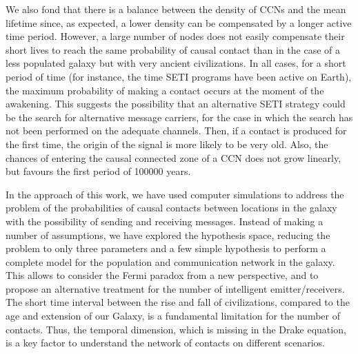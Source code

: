 \documentclass[crop]{CSLB}
\newcommand{\ceti}{CCN}
\newcommand{\cetis}{CCNs}
\begin{document}
We also fond that there 
is a balance between the density of \cetis{} and the mean
lifetime since, as expected, a lower density can be compensated by a
longer active time period.
%
However, a large number of nodes does not easily compensate their
short lives to reach the same probability of causal contact than in
the case of a less populated galaxy but with very ancient
civilizations.
%
In all cases, for a short period of time (for instance, the time SETI
programs have been active on Earth), the maximum probability of making
a contact occurs at the moment of the awakening.
%
This suggests the possibility that an alternative SETI strategy could
be the search for alternative message carriers, for the case in which
the search has not been performed on the adequate channels.
%
Then, if a contact is produced for the first time, the origin of the
signal is more likely to be very old.
%
Also, the chances of entering the causal connected zone of a \ceti{}
does not grow linearly, but favours the first period of 100000 years.


In the approach of this work, we have used computer simulations to address
the problem of the probabilities of causal contacts between locations
in the galaxy with the possibility of sending and receiving messages.
%
Instead of making a number of assumptions, we have explored the
hypothesis space, reducing the problem to only three parameters and a
few simple hypothesis to perform a complete model for the population and
communication network in the galaxy.
%
This allows to consider the Fermi paradox from a new perspective, and
to propose an alternative treatment for the number of intelligent
emitter/receivers.
%
The short time interval between the
rise and fall of civilizations, compared to the age and extension of
our Galaxy, is a fundamental limitation for the number of contacts.
%
Thus, the temporal dimension, which is missing in the Drake
equation, is a key factor to understand the network of contacts on
different scenarios.





\setlength{\bibsep}{0.0pt}

\end{document}
